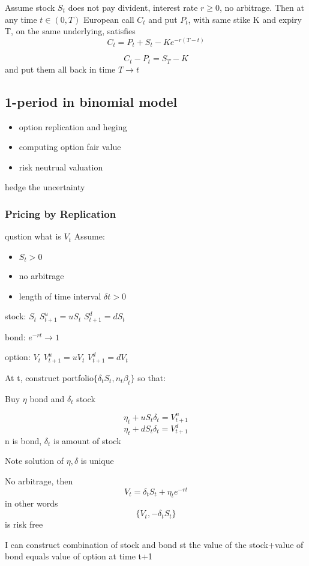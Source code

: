 \documentclass[10pt]{article}
\theoremstyle{break}
\begin{document}
Assume stock $S_t$ does not pay divident, interest rate $r\geq 0$,
no arbitrage. Then at any time $t\in(0,T)$ European call $C_t$ 
and put $P_t$, with same stike K and expiry T, on the same underlying,
satisfies 
$$C_t = P_t + S_t - Ke^{-r(T-t)}$$

$$C_t - P_t = S_T - K$$ 
and put them all back in time $T\rightarrow t$

\subsection{1-period in binomial model}
\begin{itemize}
    \item option replication and heging 
    \item computing option fair value 
    \item risk neutrual valuation
\end{itemize}

hedge the uncertainty

\subsubsection{Pricing by Replication}

qustion what is $V_t$
Assume:
\begin{itemize}
    \item $S_t>0$
    \item no arbitrage 
    \item length of time interval $\delta t>0$
\end{itemize}
stock: $S_t$ $S^u_{t+1}=uS_t$ $S^d_{t+1}=dS_t$ 

bond: $e^{-rt}\rightarrow 1$

option: $V_t$ $V^u_{t+1}=uV_t$ $V^d_{t+1}=dV_t$ 


At t, construct portfolio$\{\delta_tS_t, n_t\beta_t\}$ so that:

Buy $\eta$ bond and $\delta_t$ stock

$$\eta_t+uS_t\delta_t=V^n_{t+1}$$
$$\eta_t+dS_t\delta_t=V^d_{t+1}$$
n is bond, $\delta_t$ is amount of stock

Note solution of $\eta, \delta$ is unique 

No arbitrage, then 
$$V_t=\delta_tS_t+\eta_te^{-rt}$$
 in other words 
 $$\{V_t, -\delta_tS_t\}$$ is risk free

I can construct combination of stock and bond st 
the value of the stock+value of bond equals value of option at time t+1
\end{document}
